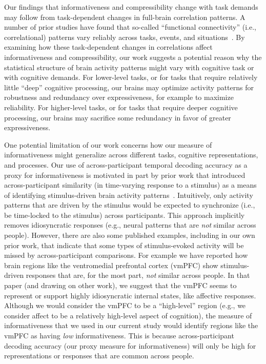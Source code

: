 \documentclass[english, 11pt]{article}
\begin{document}
Our findings that informativeness and compressibility change with task demands
may follow from task-dependent changes in full-brain correlation patterns. A
number of prior studies have found that so-called ``functional connectivity''
(i.e., correlational) patterns vary reliably across tasks, events, and
situations~\citep{SimoEtal16, ColeEtal14, SmitEtal09, OwenEtal21}. By examining
how these task-dependent changes in correlations affect informativeness and
compressibility, our work suggests a potential reason why the statistical
structure of brain activity patterns might vary with cognitive task or with
cognitive demands. For lower-level tasks, or for tasks that require relatively
little ``deep'' cognitive processing, our brains may optimize activity patterns
for robustness and redundancy over expressiveness, for example to maximize
reliability. For higher-level tasks, or for tasks that require deeper cognitive
processing, our brains may sacrifice some redundancy in favor of greater
expressiveness.

One potential limitation of our work concerns how our measure of
informativeness might generalize across different tasks, cognitive
representations, and processes. Our use of across-participant temporal decoding
accuracy as a proxy for informativeness is motivated in part by prior work that
introduced across-participant similarity (in time-varying response to a
stimulus) as a means of identifying stimulus-driven brain activity
patterns~\citep{SimoEtal16}. Intuitively, only activity patterns that are
driven by the stimulus would be expected to synchronize (i.e., be time-locked
to the stimulus) across participants. This approach implicitly removes
idiosyncratic responses (e.g., neural patterns that are \textit{not} similar
across people). However, there are also some published examples, including in
our own prior work, that indicate that some types of stimulus-evoked activity
will be missed by across-participant comparisons. For example we have reported
how brain regions like the ventromedial prefrontal cortex (vmPFC) show
stimulus-driven responses that are, for the most part, \textit{not} similar
across people. In that paper (and drawing on other work), we suggest that the
vmPFC seems to represent or support highly idiosyncratic internal states, like
affective responses. Although we would consider the vmPFC to be a
``high-level'' region (e.g., we consider affect to be a relatively high-level
aspect of cognition), the measure of informativeness that we used in our
current study would identify regions like the vmPFC as having \textit{low}
informativeness. This is because across-participant decoding accuracy (our
proxy measure for informativeness) will only be high for representations or
responses that are common across people.
\end{document}
